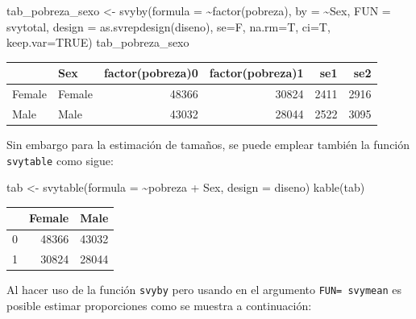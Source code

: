 \documentclass[
  12pt,
]{book}
\newenvironment{Shaded}{\begin{snugshade}}{\end{snugshade}}
\newcommand{\AttributeTok}[1]{\textcolor[rgb]{0.77,0.63,0.00}{#1}}
\newcommand{\ConstantTok}[1]{\textcolor[rgb]{0.00,0.00,0.00}{#1}}
\newcommand{\FunctionTok}[1]{\textcolor[rgb]{0.00,0.00,0.00}{#1}}
\newcommand{\NormalTok}[1]{#1}
\newcommand{\OtherTok}[1]{\textcolor[rgb]{0.56,0.35,0.01}{#1}}
\newcommand{\SpecialCharTok}[1]{\textcolor[rgb]{0.00,0.00,0.00}{#1}}
\begin{document}
\begin{Shaded}
\begin{Highlighting}[]
\NormalTok{tab\_pobreza\_sexo }\OtherTok{\textless{}{-}} \FunctionTok{svyby}\NormalTok{(}\AttributeTok{formula =} \SpecialCharTok{\textasciitilde{}}\FunctionTok{factor}\NormalTok{(pobreza), }
                          \AttributeTok{by =} \SpecialCharTok{\textasciitilde{}}\NormalTok{Sex,}
                          \AttributeTok{FUN =}\NormalTok{ svytotal, }
                          \AttributeTok{design =} \FunctionTok{as.svrepdesign}\NormalTok{(diseno), }
                          \AttributeTok{se=}\NormalTok{F, }\AttributeTok{na.rm=}\NormalTok{T, }\AttributeTok{ci=}\NormalTok{T, }\AttributeTok{keep.var=}\ConstantTok{TRUE}\NormalTok{)}
\NormalTok{tab\_pobreza\_sexo}
\end{Highlighting}
\end{Shaded}

\begin{tabular}{l|l|r|r|r|r}
\hline
  & Sex & factor(pobreza)0 & factor(pobreza)1 & se1 & se2\\
\hline
Female & Female & 48366 & 30824 & 2411 & 2916\\
\hline
Male & Male & 43032 & 28044 & 2522 & 3095\\
\hline
\end{tabular}

Sin embargo para la estimación de tamaños, se puede emplear también la función \texttt{svytable} como sigue:

\begin{Shaded}
\begin{Highlighting}[]
\NormalTok{tab }\OtherTok{\textless{}{-}} \FunctionTok{svytable}\NormalTok{(}\AttributeTok{formula =} \SpecialCharTok{\textasciitilde{}}\NormalTok{pobreza }\SpecialCharTok{+}\NormalTok{ Sex, }\AttributeTok{design =}\NormalTok{ diseno)}
\FunctionTok{kable}\NormalTok{(tab)}
\end{Highlighting}
\end{Shaded}

\begin{tabular}{l|r|r}
\hline
  & Female & Male\\
\hline
0 & 48366 & 43032\\
\hline
1 & 30824 & 28044\\
\hline
\end{tabular}

Al hacer uso de la función \texttt{svyby} pero usando en el argumento \texttt{FUN=\ svymean} es posible estimar proporciones como se muestra a continuación:
\end{document}
